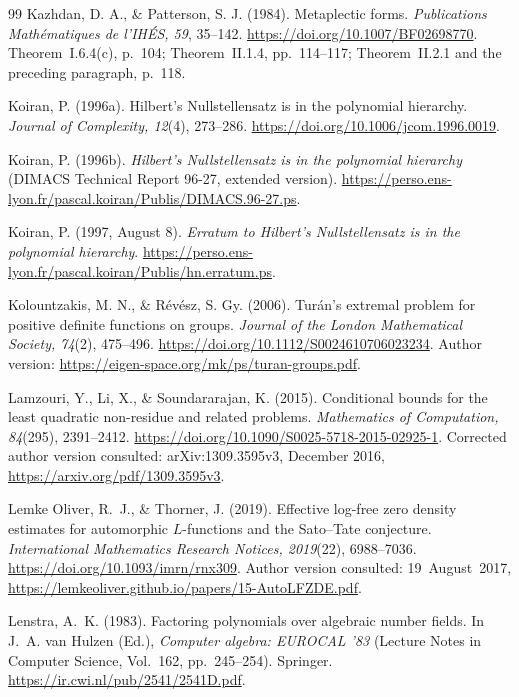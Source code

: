 \documentclass[11pt]{article}
\theoremstyle{definition}
\theoremstyle{remark}
\begin{document}
\begin{thebibliography}{99}
Kazhdan, D. A., \& Patterson, S. J. (1984).
Metaplectic forms.
\emph{Publications Math\'ematiques de l'IH\'ES, 59}, 35--142.
\url{https://doi.org/10.1007/BF02698770}.
Theorem~I.6.4(c), p.~104; Theorem~II.1.4, pp.~114--117;
Theorem~II.2.1 and the preceding paragraph, p.~118.

Koiran, P. (1996a). Hilbert's Nullstellensatz is in the polynomial hierarchy.
\emph{Journal of Complexity, 12}(4), 273--286.
\url{https://doi.org/10.1006/jcom.1996.0019}.

Koiran, P. (1996b). \emph{Hilbert's Nullstellensatz is in the polynomial hierarchy}
(DIMACS Technical Report 96-27, extended version).
\url{https://perso.ens-lyon.fr/pascal.koiran/Publis/DIMACS.96-27.ps}.

Koiran, P. (1997, August 8).
\emph{Erratum to Hilbert's Nullstellensatz is in the polynomial hierarchy}.
\url{https://perso.ens-lyon.fr/pascal.koiran/Publis/hn.erratum.ps}.

Kolountzakis, M. N., \& R\'ev\'esz, S. Gy. (2006).
Tur\'an's extremal problem for positive definite functions on groups.
\emph{Journal of the London Mathematical Society, 74}(2), 475--496.
\url{https://doi.org/10.1112/S0024610706023234}.
Author version:
\url{https://eigen-space.org/mk/ps/turan-groups.pdf}.

Lamzouri, Y., Li, X., \& Soundararajan, K. (2015).
Conditional bounds for the least quadratic non-residue and related problems.
\emph{Mathematics of Computation, 84}(295), 2391--2412.
\url{https://doi.org/10.1090/S0025-5718-2015-02925-1}.
Corrected author version consulted: arXiv:1309.3595v3, December 2016,
\url{https://arxiv.org/pdf/1309.3595v3}.

Lemke Oliver, R.~J., \& Thorner, J. (2019).
Effective log-free zero density estimates for automorphic \(L\)-functions
and the Sato--Tate conjecture.
\emph{International Mathematics Research Notices, 2019}(22), 6988--7036.
\url{https://doi.org/10.1093/imrn/rnx309}.
Author version consulted: 19~August~2017,
\url{https://lemkeoliver.github.io/papers/15-AutoLFZDE.pdf}.

Lenstra, A.~K. (1983).
Factoring polynomials over algebraic number fields.
In J.~A. van Hulzen (Ed.), \emph{Computer algebra: EUROCAL '83}
(Lecture Notes in Computer Science, Vol.~162, pp.~245--254). Springer.
\url{https://ir.cwi.nl/pub/2541/2541D.pdf}.


\end{thebibliography}
\end{document}
